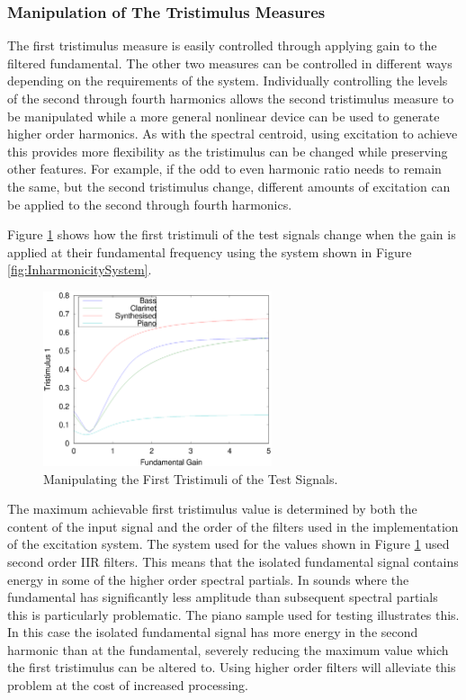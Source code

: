 		\subsubsection*{Manipulation of The Tristimulus Measures}
			The first tristimulus measure is easily controlled through applying gain to the filtered
			fundamental. The other two measures can be controlled in different ways depending on the
			requirements of the system.  Individually controlling the levels of the second through fourth
			harmonics allows the second tristimulus measure to be manipulated while a more general nonlinear
			device can be used to generate higher order harmonics. As with the spectral centroid, using
			excitation to achieve this provides more flexibility as the tristimulus can be changed while
			preserving other features. For example, if the odd to even harmonic ratio needs to remain the same,
			but the second tristimulus change, different amounts of excitation can be applied to the second
			through fourth harmonics.

			Figure \ref{fig:MoveTristimulus1} shows how the first tristimuli of the test signals change when
			the gain is applied at their fundamental frequency using the system shown in Figure
			\ref{fig:InharmonicitySystem}.

			\begin{figure}[h!]
				\centering
				\includegraphics[width=0.6\textwidth]{chapter6/Images/MoveTristimulus1.eps}
				\caption{Manipulating the First Tristimuli of the Test Signals.}
				\label{fig:MoveTristimulus1}
			\end{figure}

			The maximum achievable first tristimulus value is determined by both the content of the input
			signal and the order of the filters used in the implementation of the excitation system. The system
			used for the values shown in Figure \ref{fig:MoveTristimulus1} used second order IIR filters. This
			means that the isolated fundamental signal contains energy in some of the higher order spectral
			partials. In sounds where the fundamental has significantly less amplitude than subsequent spectral
			partials this is particularly problematic. The piano sample used for testing illustrates this. In
			this case the isolated fundamental signal has more energy in the second harmonic than at the
			fundamental, severely reducing the maximum value which the first tristimulus can be altered to.
			Using higher order filters will alleviate this problem at the cost of increased processing.

